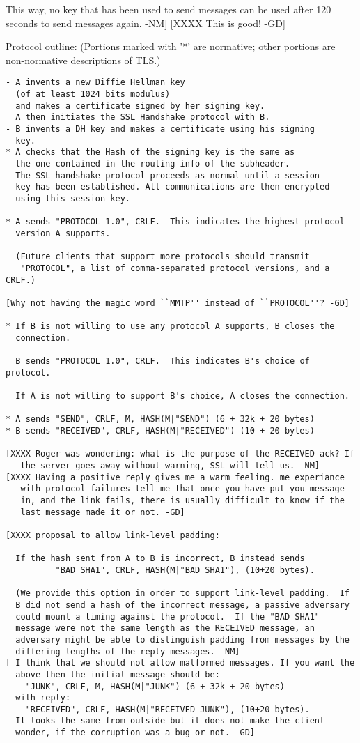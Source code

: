    This way, no key that has been used to send messages can be used
   after 120 seconds to send messages again. -NM]
[XXXX
   This is good! -GD]

Protocol outline: (Portions marked with '*' are normative; other
portions are non-normative descriptions of TLS.)

\begin{verbatim}
- A invents a new Diffie Hellman key 
  (of at least 1024 bits modulus)
  and makes a certificate signed by her signing key.
  A then initiates the SSL Handshake protocol with B.
- B invents a DH key and makes a certificate using his signing
  key.
* A checks that the Hash of the signing key is the same as
  the one contained in the routing info of the subheader.
- The SSL handshake protocol proceeds as normal until a session
  key has been established. All communications are then encrypted
  using this session key.

* A sends "PROTOCOL 1.0", CRLF.  This indicates the highest protocol
  version A supports.

  (Future clients that support more protocols should transmit
   "PROTOCOL", a list of comma-separated protocol versions, and a CRLF.)

[Why not having the magic word ``MMTP'' instead of ``PROTOCOL''? -GD]

* If B is not willing to use any protocol A supports, B closes the 
  connection.

  B sends "PROTOCOL 1.0", CRLF.  This indicates B's choice of protocol.

  If A is not willing to support B's choice, A closes the connection.

* A sends "SEND", CRLF, M, HASH(M|"SEND") (6 + 32k + 20 bytes)
* B sends "RECEIVED", CRLF, HASH(M|"RECEIVED") (10 + 20 bytes)

[XXXX Roger was wondering: what is the purpose of the RECEIVED ack? If
   the server goes away without warning, SSL will tell us. -NM]
[XXXX Having a positive reply gives me a warm feeling. me experiance
   with protocol failures tell me that once you have put you message
   in, and the link fails, there is usually difficult to know if the
   last message made it or not. -GD]

[XXXX proposal to allow link-level padding:

  If the hash sent from A to B is incorrect, B instead sends
          "BAD SHA1", CRLF, HASH(M|"BAD SHA1"), (10+20 bytes).

  (We provide this option in order to support link-level padding.  If
  B did not send a hash of the incorrect message, a passive adversary
  could mount a timing against the protocol.  If the "BAD SHA1"
  message were not the same length as the RECEIVED message, an
  adversary might be able to distinguish padding from messages by the
  differing lengths of the reply messages. -NM]
[ I think that we should not allow malformed messages. If you want the
  above then the initial message should be:
	"JUNK", CRLF, M, HASH(M|"JUNK") (6 + 32k + 20 bytes)
  with reply:
	"RECEIVED", CRLF, HASH(M|"RECEIVED JUNK"), (10+20 bytes).
  It looks the same from outside but it does not make the client
  wonder, if the corruption was a bug or not. -GD]



\end{verbatim}
